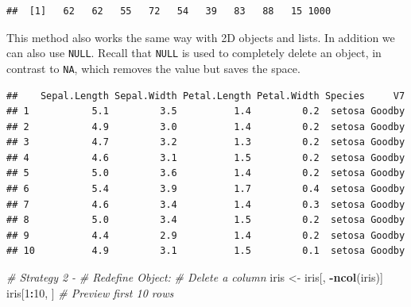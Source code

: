 \documentclass[
]{book}
\newenvironment{Shaded}{\begin{snugshade}}{\end{snugshade}}
\newcommand{\CommentTok}[1]{\textcolor[rgb]{0.56,0.35,0.01}{\textit{#1}}}
\newcommand{\DecValTok}[1]{\textcolor[rgb]{0.00,0.00,0.81}{#1}}
\newcommand{\KeywordTok}[1]{\textcolor[rgb]{0.13,0.29,0.53}{\textbf{#1}}}
\newcommand{\NormalTok}[1]{#1}
\newcommand{\OperatorTok}[1]{\textcolor[rgb]{0.81,0.36,0.00}{\textbf{#1}}}
\newcommand{\OtherTok}[1]{\textcolor[rgb]{0.56,0.35,0.01}{#1}}
\newcommand{\StringTok}[1]{\textcolor[rgb]{0.31,0.60,0.02}{#1}}
\begin{document}
\begin{verbatim}
##  [1]   62   62   55   72   54   39   83   88   15 1000
\end{verbatim}

This method also works the same way with 2D objects and lists. In addition we can also use \texttt{NULL}. Recall that \texttt{NULL} is used to completely delete an object, in contrast to \texttt{NA}, which removes the value but saves the space.

\begin{Shaded}
\end{Shaded}

\begin{verbatim}
##    Sepal.Length Sepal.Width Petal.Length Petal.Width Species     V7
## 1           5.1         3.5          1.4         0.2  setosa Goodby
## 2           4.9         3.0          1.4         0.2  setosa Goodby
## 3           4.7         3.2          1.3         0.2  setosa Goodby
## 4           4.6         3.1          1.5         0.2  setosa Goodby
## 5           5.0         3.6          1.4         0.2  setosa Goodby
## 6           5.4         3.9          1.7         0.4  setosa Goodby
## 7           4.6         3.4          1.4         0.3  setosa Goodby
## 8           5.0         3.4          1.5         0.2  setosa Goodby
## 9           4.4         2.9          1.4         0.2  setosa Goodby
## 10          4.9         3.1          1.5         0.1  setosa Goodby
\end{verbatim}

\begin{Shaded}
\begin{Highlighting}[]
\CommentTok{# Strategy 2 -}
\CommentTok{# Redefine Object:}
\CommentTok{# Delete a column}
\NormalTok{iris <-}\StringTok{ }\NormalTok{iris[, }\OperatorTok{-}\KeywordTok{ncol}\NormalTok{(iris)]}
\NormalTok{iris[}\DecValTok{1}\OperatorTok{:}\DecValTok{10}\NormalTok{, ]  }\CommentTok{# Preview first 10 rows }
\end{Highlighting}
\end{Shaded}
\end{document}

